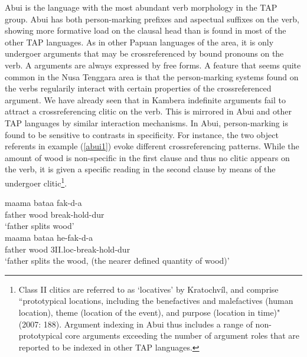 Abui is the language with the most abundant verb morphology in the TAP group. Abui has both person-marking prefixes and aspectual suffixes on the verb, showing more formative load on the clausal head than is found in most of the other TAP languages. As in other Papuan languages of the area, it is only undergoer arguments that may be crossreferenced by bound pronouns on the verb. A arguments are always expressed by free forms. A feature that seems quite common in the Nusa Tenggara area is that the person-marking systems found on the verbs regularily interact with certain properties of the crossreferenced argument. We have already seen that in Kambera indefinite arguments fail to attract a crossreferencing clitic on the verb. This is mirrored in Abui and other TAP languages by similar interaction mechanisms. In Abui, person-marking is found to be sensitive to contrasts in specificity. For instance, the two object referents in example (\ref{abui1}) evoke different crossreferencing patterns. While the amount of wood is non-specific in the first clause and thus no clitic appears on the verb, it is given a specific reading in the second clause by means of the undergoer clitic\footnote{Class II clitics are referred to as `locatives' by Kratochvíl, and comprise ``prototypical locations, including the
benefactives and malefactives (human location), theme (location of the event), and
purpose (location in time)" (2007: 188). Argument indexing in Abui thus includes a range of non-prototypical core arguments exceeding the number of argument roles that are reported to be indexed in other TAP languages.}.

\pex \label{abui1}
\a
\gll maama bataa fak-d-a \\
father wood break-hold-\acs{dur} \\
\glft `father splits wood’ \\ 
\endgl
\a
\gla maama bataa he-fak-d-a \\ 
father wood \acs{3}II.\acs{loc}-break-hold-\acs{dur} \\
\glft `father splits the wood, (the nearer defined quantity of wood)’ \\ 
\endgl
\xe

